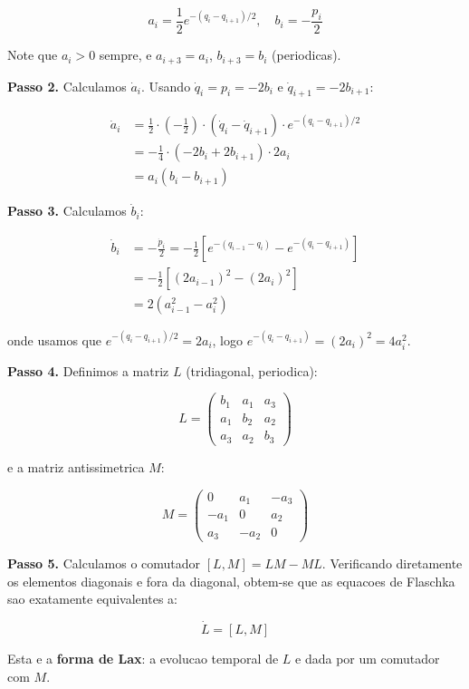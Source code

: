\documentclass[12pt,a4paper,oneside]{article}
\begin{document}
$$a_i = \frac12 e^{-(q_i - q_{i+1})/2}, \quad b_i = -\frac{p_i}{2}$$

Note que $a_i > 0$ sempre, e $a_{i+3} = a_i$, $b_{i+3} = b_i$ (periodicas).

\textbf{Passo 2.} Calculamos $\dot a_i$. Usando $\dot q_i = p_i = -2b_i$ e
$\dot q_{i+1} = -2b_{i+1}$:

\begin{align*}
\dot a_i &= \frac12 \cdot \left(-\frac12\right) \cdot (\dot q_i - \dot q_{i+1})
\cdot e^{-(q_i-q_{i+1})/2} \\
&= -\frac14 \cdot (-2b_i + 2b_{i+1}) \cdot 2a_i \\
&= a_i(b_i - b_{i+1})
\end{align*}

\textbf{Passo 3.} Calculamos $\dot b_i$:

\begin{align*}
\dot b_i &= -\frac{\dot p_i}{2}
= -\frac12\left[e^{-(q_{i-1}-q_i)} - e^{-(q_i-q_{i+1})}\right] \\
&= -\frac12\left[(2a_{i-1})^2 - (2a_i)^2\right] \\
&= 2(a_{i-1}^2 - a_i^2)
\end{align*}

onde usamos que $e^{-(q_i-q_{i+1})/2} = 2a_i$, logo $e^{-(q_i-q_{i+1})} =
(2a_i)^2 = 4a_i^2$.

\textbf{Passo 4.} Definimos a matriz $L$ (tridiagonal, periodica):

$$L = \begin{pmatrix}
b_1 & a_1 & a_3 \\
a_1 & b_2 & a_2 \\
a_3 & a_2 & b_3
\end{pmatrix}$$

e a matriz antissimetrica $M$:

$$M = \begin{pmatrix}
0 & a_1 & -a_3 \\
-a_1 & 0 & a_2 \\
a_3 & -a_2 & 0
\end{pmatrix}$$

\textbf{Passo 5.} Calculamos o comutador $[L,M] = LM - ML$. Verificando
diretamente os elementos diagonais e fora da diagonal, obtem-se que as
equacoes de Flaschka sao exatamente equivalentes a:

$$\boxed{\dot L = [L, M]}$$

Esta e a \textbf{forma de Lax}: a evolucao temporal de $L$ e dada por um
comutador com $M$.
\end{document}
